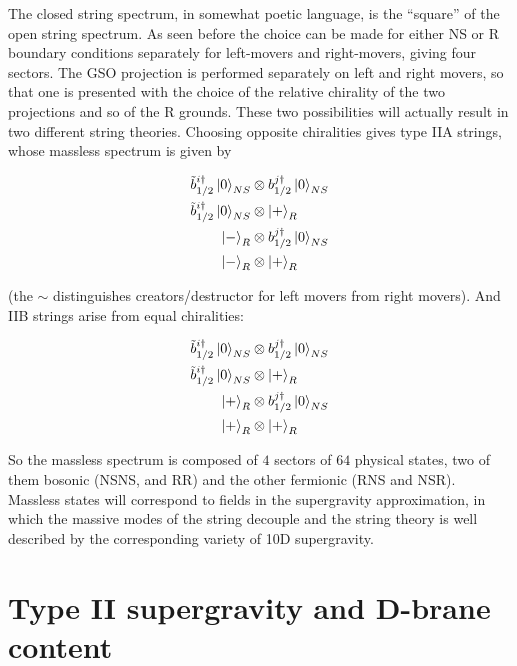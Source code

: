 The closed string spectrum, in somewhat poetic language, is the ``square'' of the open string spectrum. As seen before the choice can be made for either NS or R boundary conditions separately for left-movers and right-movers, giving four sectors. The GSO projection is performed separately on left and right movers, so that one is presented with the choice of the relative chirality of the two projections and so of the R grounds. These two possibilities will actually result in two different string theories. Choosing opposite chiralities gives type IIA strings, whose massless spectrum is given by

\begin{align}
	\tilde b_{1/2}^{i\dagger} \ket 0_{NS} &\otimes b_{1/2}^{j\dagger}\ket{0}_{NS} \\
	\tilde b_{1/2}^{i\dagger} \ket 0_{NS} &\otimes \ket{+}_{R}\\
	\ket{-}_R &\otimes b_{1/2}^{j\dagger}\ket{0}_{NS}\\
	\ket{-}_R &\otimes \ket{+}_R
	\label{}
\end{align}

(the $\sim$ distinguishes creators/destructor for left movers from right movers). And IIB strings arise from equal chiralities:


\begin{align}
	\tilde b_{1/2}^{i\dagger} \ket 0_{NS} &\otimes b_{1/2}^{j\dagger}\ket{0}_{NS} \\
	\tilde b_{1/2}^{i\dagger} \ket 0_{NS} &\otimes \ket{+}_{R}\\
	\ket{+}_R &\otimes b_{1/2}^{j\dagger}\ket{0}_{NS}\\
	\ket{+}_R &\otimes \ket{+}_R
	\label{}
\end{align}

So the massless spectrum is composed of $4$ sectors of $64$ physical states, two of them bosonic (NSNS, and RR) and the other fermionic (RNS and NSR). Massless states will correspond to fields in the supergravity approximation, in which the massive modes of the string decouple and the string theory is well described by the corresponding variety of 10D supergravity.\\


\section{Type II supergravity and D-brane content}

